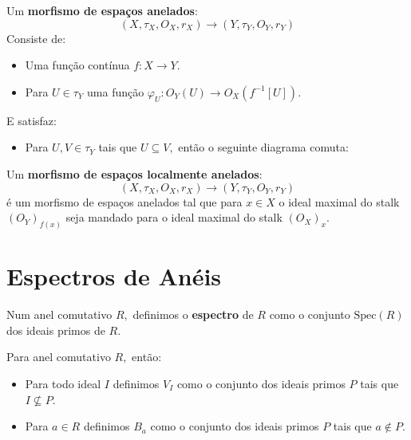 \documentclass[11pt,twoside,a4paper]{book}
\begin{document}
\begin{exemplo}
\end{exemplo}

\begin{definicao}
Um \textbf{morfismo de espaços anelados}:
\[
(X,\tau_X,O_X,r_X)\rightarrow(Y,\tau_Y,O_Y,r_Y)
\]
Consiste de:
\begin{itemize}
\item Uma função contínua $f:X\rightarrow Y.$
\item Para $U\in\tau_Y$ uma função $\varphi_U:O_Y(U)\rightarrow O_X(f^{-1}[U]).$
\end{itemize}
E satisfaz:
\begin{itemize}
\item Para $U,V\in\tau_Y$ tais que $U\subseteq V,$ então o seguinte diagrama comuta:
\begin{center}
\end{center}
\end{itemize}
\end{definicao}

\begin{definicao}
Um \textbf{morfismo de espaços localmente anelados}:
\[
(X,\tau_X,O_X,r_X)\rightarrow(Y,\tau_Y,O_Y,r_Y)
\]
é um morfismo de espaços anelados tal que para $x\in X$ o ideal maximal do stalk $(O_Y)_{f(x)}$ seja mandado para o ideal maximal do stalk $(O_X)_{x}.$
\end{definicao}

\section{Espectros de Anéis}

\begin{definicao}
Num anel comutativo $R,$ definimos o \textbf{espectro} de $R$ como o conjunto $\mathrm{Spec}(R)$ dos ideais primos de $R.$
\end{definicao}

\begin{definicao}
Para anel comutativo $R,$ então:
\begin{itemize}
\item Para todo ideal $I$ definimos $V_I$ como o conjunto dos ideais primos $P$ tais que $I\nsubseteq P.$
\item Para $a\in R$ definimos $B_a$ como o conjunto dos ideais primos $P$ tais que $a\notin P.$
\end{itemize} 
\end{definicao}
\end{document}
